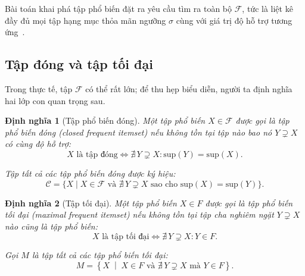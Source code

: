 \documentclass[12pt,a4paper]{report}
\newtheorem{definition}{Định nghĩa}[chapter]
\begin{document}
Bài toán khai phá tập phổ biến đặt ra yêu cầu tìm ra toàn bộ $\mathcal{F}$, tức là
liệt kê đầy đủ mọi tập hạng mục thỏa mãn ngưỡng $\sigma$ cùng với giá trị độ hỗ trợ
tương ứng~\cite{borgelt2005}.
 
\subsection{Tập đóng và tập tối đại}
 
Trong thực tế, tập $\mathcal{F}$ có thể rất lớn; để thu hẹp biểu diễn, người ta định
nghĩa hai lớp con quan trọng sau.
 
\begin{definition}[Tập phổ biến đóng]

Một tập phổ biến $X \in \mathcal{F}$ được gọi là \textit{tập phổ biến đóng}
(\textit{closed frequent itemset}) nếu không tồn tại tập nào bao nó
$Y \supsetneq X$ có cùng độ hỗ trợ:
\begin{equation}
    X \text{ là tập đóng}
    \iff
    \nexists\, Y \supsetneq X :
    \mathrm{sup}(Y) = \mathrm{sup}(X).
    \label{eq:closed}
\end{equation}

Tập tất cả các tập phổ biến đóng được ký hiệu:
\begin{equation}
\mathcal{C}
=
\{X \mid X \in \mathcal{F}
\text{ và }
\nexists\, Y \supsetneq X
\text{ sao cho }
\mathrm{sup}(X)=\mathrm{sup}(Y)\}.
\label{eq:closed_itemset}
\end{equation}
\end{definition}
 
\begin{definition}[Tập tối đại]
Một tập phổ biến $X \in F$ được gọi là \textit{tập phổ biến tối đại}
(\textit{maximal frequent itemset}) nếu không tồn tại tập cha nghiêm ngặt
$Y \supsetneq X$ nào cũng là tập phổ biến:
\begin{equation}
    X \text{ là tập tối đại}
    \iff
    \nexists\, Y \supsetneq X :
    Y \in F.
    \label{eq:maximal}
\end{equation}

Gọi $M$ là tập tất cả các tập phổ biến tối đại:
\begin{equation}
M =
\left\{
X \;\middle|\;
X \in F
\text{ và }
\nexists\, Y \supsetneq X
\text{ mà }
Y \in F
\right\}.
\label{eq:maximal_itemset}
\end{equation}
\end{definition}
 
\end{document}

